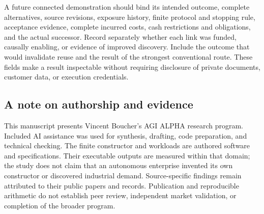 \documentclass[10pt,a4paper]{article}
\begin{document}
A future connected demonstration should bind its intended outcome, complete alternatives, source revisions, exposure history, finite protocol and stopping rule, acceptance evidence, complete incurred costs, cash restrictions and obligations, and the actual successor. Record separately whether each link was funded, causally enabling, or evidence of improved discovery. Include the outcome that would invalidate reuse and the result of the strongest conventional route. These fields make a result inspectable without requiring disclosure of private documents, customer data, or execution credentials.

\subsection{A note on authorship and evidence}

This manuscript presents Vincent Boucher's AGI ALPHA research program. Included AI assistance was used for synthesis, drafting, code preparation, and technical checking. The finite constructor and workloads are authored software and specifications. Their executable outputs are measured within that domain; the study does not claim that an autonomous enterprise invented its own constructor or discovered industrial demand. Source-specific findings remain attributed to their public papers and records. Publication and reproducible arithmetic do not establish peer review, independent market validation, or completion of the broader program.

{}

\begingroup\small
{}

\endgroup
\end{document}
